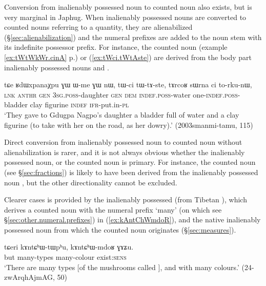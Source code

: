 Conversion from inalienably possessed noun to counted noun also exists, but is very marginal in Japhug. When inalienably possessed nouns are converted to counted nouns referring to a quantity, they are alienabilized (§\ref{sec:alienabilization}) and the numeral prefixes are added to the noun stem with its indefinite possessor prefix. For instance, the counted noun  (example \ref{ex:tWtWkWr.cinA} p.\pageref{ex:tWtWkWr.cinA}) or  (\ref{ex:tWci.tWtAste}) are derived from the body part inalienably possessed nouns  and . 

\begin{exe}
\ex \label{ex:tWci.tWtAste}
\gll  tɕe ʁdɯxpanaχpu ɣɯ ɯ-me ɣɯ nɯ, tɯ-ci tɯ-tɤ-ste, tɤrcoʁ sɯrna ci to-rku-nɯ, \\
 \textsc{lnk}  \textsc{anthr} \textsc{gen} \textsc{3sg}.\textsc{poss}-daughter \textsc{gen} \textsc{dem} \textsc{indef}.\textsc{poss}-water one-\textsc{indef}.\textsc{poss}-bladder clay figurine \textsc{indef} \textsc{ifr}-put.in-\textsc{pl} \\
\glt `They gave to Gdugpa Nagpo's daughter a bladder full of water and a clay figurine (to take with her on the road, as her dowry).' (2003smanmi-tamu, 115)
\end{exe}

Direct conversion from inalienably possessed noun to counted noun without alienabilization is rarer, and it is not always obvious whether the inalienably possessed noun, or the counted noun is primary. For instance, the counted noun  (see §\ref{sec:fractions}) is likely to have been derived from the inalienably possessed noun , but the other directionality cannot be excluded. 

Clearer cases is provided by the inalienably possessed   (from Tibetan ), which derives a counted noun with the numeral prefix  `many' (on which see §\ref{sec:other.numeral.prefixes}) in (\ref{ex:kAntChWmdoR}), and the native inalienably possessed noun  from which the counted noun  originates (§\ref{sec:measures}).

\begin{exe}
\ex \label{ex:kAntChWmdoR}
\gll  tɕeri kɤntɕʰɯ-tɯpʰu, kɤntɕʰɯ-mdoʁ ɣɤʑu. \\
 but many-types many-colour exist:\textsc{sens} \\
\glt  `There are many types [of the mushrooms called ], and with many colours.' (24-zwArqhAjmAG, 50)
\end{exe}

